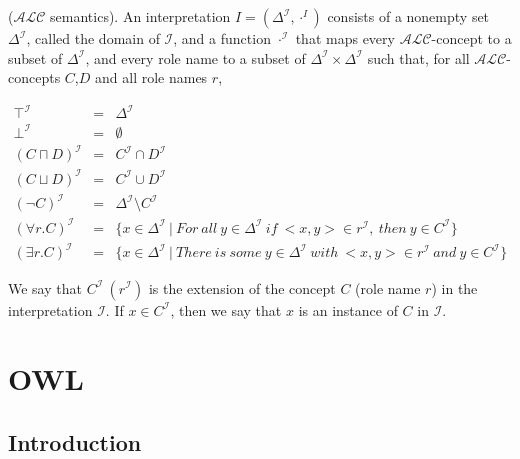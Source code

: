 \begin{definition}\label{alcSemantics} ($\mathcal{ALC}$ semantics). An interpretation $I = (\Delta^{\mathcal{I}},\cdot^{I})$ consists of a nonempty set $\Delta^{\mathcal{I}}$, called the domain of $\mathcal{I}$, and a function $\cdot^{\mathcal{I}}$ that maps every $\mathcal{ALC}$-concept to a subset of $\Delta^{\mathcal{I}}$, and every role name to a subset of $\Delta^{\mathcal{I}} \times \Delta^{\mathcal{I}}$ such that, for all $\mathcal{ALC}$-concepts $C$,$D$ and all role names $r$,

\smallskip

\[
\begin{array}{rcl}
    \top^{\mathcal{I}}          & =	& \Delta^{\mathcal{I}} \\
    \bot^{\mathcal{I}}          & =	& \emptyset \\
    (C\sqcap D)^{\mathcal{I}}   & =	& C^{\mathcal{I}}\cap D^{\mathcal{I}} \\
    (C\sqcup D)^{\mathcal{I}}   & =	& C^{\mathcal{I}}\cup D^{\mathcal{I}} \\
    (\lnot C)^{\mathcal{I}}     & =	& \Delta^{\mathcal{I}}\setminus C^{\mathcal{I}} \\
    (\forall r.C)^{\mathcal{I}} & =	& \{x \in \Delta^{\mathcal{I}}~|~ For~ all~ y \in \Delta^{\mathcal{I}}~ if~<x,y> \in r^{\mathcal{I}},~ then~ y \in C^{\mathcal{I}}\} \\
    (\exists r.C)^{\mathcal{I}} & =	& \{x \in \Delta^{\mathcal{I}}~|~There~ is~ some~ y \in \Delta^{\mathcal{I}}~ with~ <x,y> \in r^{\mathcal{I}}~ and~ y \in C^{\mathcal{I}}\}
\end{array}
\]

\smallskip

\noindent We say that $C^{\mathcal{I}}~ (r^{\mathcal{I}})$ is the extension of the concept $C$ (role name $r$) in the interpretation $\mathcal{I}$. If $x\in C^{\mathcal{I}}$, then we say that $x$ is an instance of $C$ in $\mathcal{I}$.
\end{definition}

\section{OWL}
\label{sec:owl}

\subsection{Introduction}
\label{sub:owlIntroduction}

